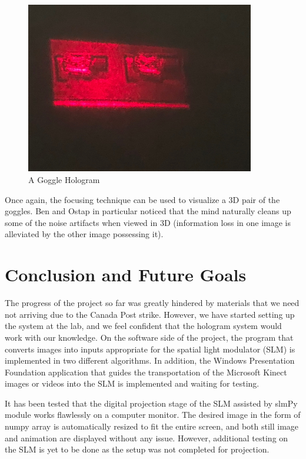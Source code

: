 \documentclass[12pt]{article}
\begin{document}
\begin{figure}
    \centering
    \includegraphics[width=100mm]{final_hologram.jpg}
    \caption{A Goggle Hologram}
    \label{fig:goggle_holo}
\end{figure}

Once again, the focusing technique can be used to visualize a 3D pair of the goggles. Ben and Ostap in particular noticed that the mind naturally cleans up some of the noise artifacts when viewed in 3D (information loss in one image is alleviated by the other image possessing it).

\section{Conclusion and Future Goals}

The progress of the project so far was greatly hindered by materials that we need not arriving due to the Canada Post strike. However, we have started setting up the system at the lab, and we feel confident that the hologram system would work with our knowledge. On the software side of the project, the program that converts images into inputs appropriate for the spatial light modulator (SLM) is implemented in two different algorithms. In addition, the Windows Presentation Foundation application that guides the transportation of the Microsoft Kinect images or videos into the SLM is implemented and waiting for testing.

It has been tested that the digital projection stage of the SLM assisted by slmPy module works flawlessly on a computer monitor. The desired image in the form of numpy array is automatically resized to fit the entire screen, and both still image and animation are displayed without any issue. However, additional testing on the SLM is yet to be done as the setup was not completed for projection.
\end{document}
